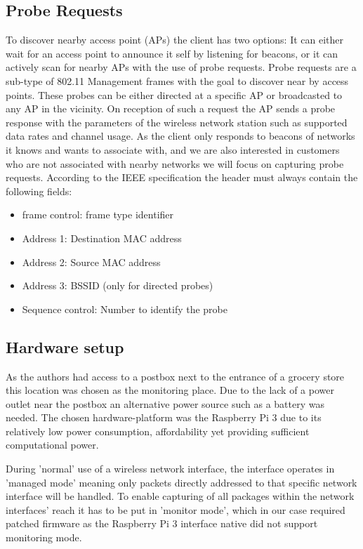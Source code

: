 \documentclass[conference,compsoc]{IEEEtran}
\begin{document}
\subsection{Probe Requests}
To discover nearby access point (APs) the client has two options: It can either wait for an access point to announce it self by listening for beacons, or it can actively scan for nearby APs with the use of probe requests. Probe requests are a sub-type of 802.11 Management frames with the goal to discover near by access points. These probes can be either directed at a specific AP or broadcasted to any AP in the vicinity. On reception of such a request the AP sends a probe response with the parameters of the wireless network station such as supported data rates and channel usage. As the client only responds to beacons of networks it knows and wants to associate with, and we are also interested in customers who are not associated with nearby networks we will focus on capturing probe requests. According to the IEEE specification the header must always contain the following fields:
\begin{itemize}
\item frame control: frame type identifier
\item Address 1: Destination MAC address
\item Address 2: Source MAC address
\item Address 3: BSSID (only for directed probes)
\item Sequence control: Number to identify the probe
\end{itemize}


\subsection{Hardware setup}
As the authors had access to a postbox next to the entrance of a grocery store this location was chosen as the monitoring place. Due to the lack of a power outlet near the postbox an alternative power source such as a battery was needed. The chosen hardware-platform was the Raspberry Pi 3 due to its relatively low power consumption, affordability yet providing sufficient computational power.

During 'normal' use of a wireless network interface, the interface operates in 'managed mode' meaning only packets directly addressed to that specific network interface will be handled. To enable capturing of all packages within the network interfaces' reach it has to be put in 'monitor mode', which in our case required patched firmware as the Raspberry Pi 3 interface native did not support monitoring mode.
\end{document}
